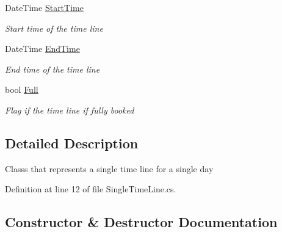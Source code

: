 \begin{DoxyCompactItemize}
Date\+Time \hyperlink{class_general_health_care_elements_1_1_booking_models_1_1_single_per_day_time_line_a93de5cc16f299e9103ac0aa6f0cf33f5}{Start\+Time}
\begin{DoxyCompactList}\small\item\em Start time of the time line \end{DoxyCompactList}\item 
Date\+Time \hyperlink{class_general_health_care_elements_1_1_booking_models_1_1_single_per_day_time_line_ad8f42e172163d688ba355a564a1d1177}{End\+Time}
\begin{DoxyCompactList}\small\item\em End time of the time line \end{DoxyCompactList}\item 
bool \hyperlink{class_general_health_care_elements_1_1_booking_models_1_1_single_per_day_time_line_a007cbae501dd6f2bfebcdbd701725ef8}{Full}
\begin{DoxyCompactList}\small\item\em Flag if the time line if fully booked \end{DoxyCompactList}\end{DoxyCompactItemize}


\subsection{Detailed Description}
Classs that represents a single time line for a single day 



Definition at line 12 of file Single\+Time\+Line.\+cs.



\subsection{Constructor \& Destructor Documentation}
